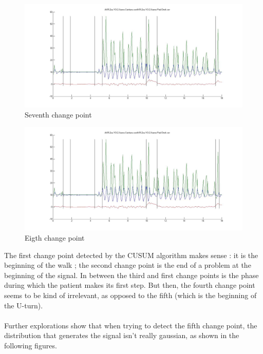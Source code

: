 \documentclass[french]{article}
\begin{document}
\begin{figure}[h]
	\includegraphics[scale=0.3]{seg7.jpg}
	\caption{Seventh change point}
\end{figure}

\begin{figure}[h]
	\includegraphics[scale=0.3]{seg8.jpg}
	\caption{Eigth change point}
\end{figure}

The first change point detected by the CUSUM algorithm makes sense : it is the beginning of the walk ; the second change point is the end of a problem at the beginning of the signal. In between the third and first change points is the phase during which the patient makes its first step. But then, the fourth change point seems to be kind of irrelevant, as opposed to the fifth (which is the beginning of the U-turn).
\\ \\
Further explorations show that when trying to detect the fifth change point, the distribution that generates the signal isn't really gaussian, as shown in the following figures.
\end{document}
